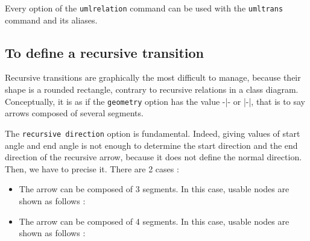 \documentclass[a4paper,11pt]{report}
\newcommand{\inputTikZ}[1]{%
  }%
\newcommand{\inputTikZ}[1]{%
    \texttt{[image: fig/\#1.pdf]}%
  }%
\begin{document}
\begin{minipage}{0.51\textwidth}

\end{minipage}
\begin{minipage}{0.49\textwidth}
\begin{center}
\inputTikZ{transition}
\end{center}
\end{minipage}

\medskip

Every option of the {\tt umlrelation} command can be used with the {\tt umltrans} command and its aliases.

\subsection{To define a recursive transition}\label{s.rectrans}

Recursive transitions are graphically the most difficult to manage, because their shape is a rounded rectangle, contrary to recursive relations in a class diagram. Conceptually, it is as if the {\tt geometry} option has the value -|- or |-|, that is to say arrows composed of several segments.

\medskip

\begin{minipage}{0.51\textwidth}

\end{minipage}
\begin{minipage}{0.49\textwidth}
\begin{center}
\inputTikZ{transitionrec}
\end{center}
\end{minipage}

\medskip

The {\tt recursive direction} option is fundamental. Indeed, giving values of start angle and end angle is not enough to determine the start direction and the end direction of the recursive arrow, because it does not define the normal direction. Then, we have to precise it. There are 2 cases :

\medskip

\begin{itemize}
\item The arrow can be composed of 3 segments. In this case, usable nodes are shown as follows :

\begin{center}
\inputTikZ{transitionrec-rtr-ptname}
\end{center}

\item The arrow can be composed of 4 segments. In this case, usable nodes are shown as follows :

\medskip

\begin{center}
\inputTikZ{transitionrec-rtb-ptname}
\end{center}

\vspace{-4cm}

\end{itemize}
\end{document}
